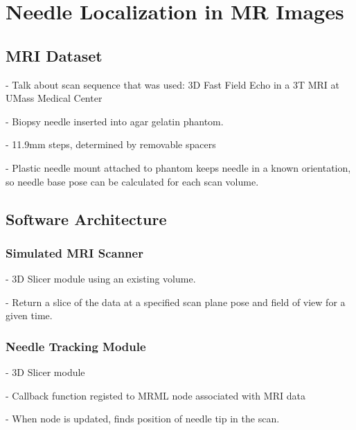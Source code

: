 %
%
%



\chapter{Needle Localization in MR Images}

\section{MRI Dataset}
- Talk about scan sequence that was used: 3D Fast Field Echo in a 3T MRI at UMass Medical Center

- Biopsy needle inserted into agar gelatin phantom.

- 11.9mm steps, determined by removable spacers

- Plastic needle mount attached to phantom keeps needle in a known orientation, so needle base pose can be calculated for each scan volume.

\section{Software Architecture}
\subsection{Simulated MRI Scanner}
- 3D Slicer module using an existing volume.

- Return a slice of the data at a specified scan plane pose and field of view for a given time.

\subsection{Needle Tracking Module}
- 3D Slicer module

- Callback function registed to MRML node associated with MRI data

- When node is updated, finds position of needle tip in the scan.

